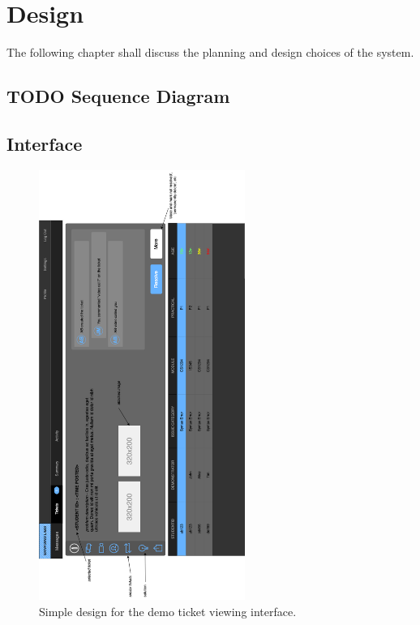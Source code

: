 \chapter{Design}
The following chapter shall discuss the planning and design choices of the system. 



\newpage
\section{TODO Sequence Diagram}

\newpage
\section{Interface}

\begin{figure}[H]
    \centering
    \includegraphics[width=0.6\textwidth]{7design/images/demoTickets.png}
    \caption{Simple design for the demo ticket viewing interface.}
    \label{fig:demoTickets}
\end{figure}

